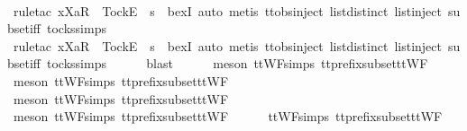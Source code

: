 \ \ \ \ \isamarkupfalse%
\ {\isacharparenleft}rule{\isacharunderscore}tac\ x{\isacharequal}{\isachardoublequoteopen}{\isacharbrackleft}Xa{\isacharbrackright}\isactrlsub R\ {\isacharhash}\ {\isacharbrackleft}Tock{\isacharbrackright}\isactrlsub E\ {\isacharhash}\ s{\isacharprime}{\isachardoublequoteclose}\ \ bexI{\isacharcomma}\ auto{\isacharcomma}\ metis\ ttobs{\isachardot}inject{\isacharparenleft}{}{\isacharparenright}\ list{\isachardot}distinct{\isacharparenleft}{}{\isacharparenright}\ list{\isachardot}inject\ subset{\isacharunderscore}iff\ tocks{\isachardot}simps{\isacharparenright}\isanewline
\ \ \ \ \isamarkupfalse%
\ {\isacharparenleft}rule{\isacharunderscore}tac\ x{\isacharequal}{\isachardoublequoteopen}{\isacharbrackleft}Xa{\isacharbrackright}\isactrlsub R\ {\isacharhash}\ {\isacharbrackleft}Tock{\isacharbrackright}\isactrlsub E\ {\isacharhash}\ s{\isacharprime}{\isachardoublequoteclose}\ \ bexI{\isacharcomma}\ auto{\isacharcomma}\ metis\ ttobs{\isachardot}inject{\isacharparenleft}{}{\isacharparenright}\ list{\isachardot}distinct{\isacharparenleft}{}{\isacharparenright}\ list{\isachardot}inject\ subset{\isacharunderscore}iff\ tocks{\isachardot}simps{\isacharparenright}\isanewline
\ \ \ \ \isamarkupfalse%
\ blast\isanewline
\ \ \ \ \isamarkupfalse%
\ {\isacharparenleft}meson\ ttWF{\isachardot}simps{\isacharparenleft}{}{}{\isacharparenright}\ tt{\isacharunderscore}prefix{\isacharunderscore}subset{\isacharunderscore}ttWF{\isacharparenright}\isanewline
\ \ \ \ \isamarkupfalse%
\ {\isacharparenleft}meson\ ttWF{\isachardot}simps{\isacharparenleft}{}{}{\isacharparenright}\ tt{\isacharunderscore}prefix{\isacharunderscore}subset{\isacharunderscore}ttWF{\isacharparenright}\isanewline
\ \ \ \ \isamarkupfalse%
\ {\isacharparenleft}meson\ ttWF{\isachardot}simps{\isacharparenleft}{}{}{\isacharparenright}\ tt{\isacharunderscore}prefix{\isacharunderscore}subset{\isacharunderscore}ttWF{\isacharparenright}\isanewline
\ \ \ \ \isamarkupfalse%
\ {\isacharparenleft}meson\ ttWF{\isachardot}simps{\isacharparenleft}{}{\isacharparenright}\ tt{\isacharunderscore}prefix{\isacharunderscore}subset{\isacharunderscore}ttWF{\isacharparenright}\isanewline
\ \ \ \ \isamarkupfalse%
\ ttWF{\isachardot}simps{\isacharparenleft}{}{\isacharparenright}\ tt{\isacharunderscore}prefix{\isacharunderscore}subset{\isacharunderscore}ttWF\ \isamarkupfalse%
